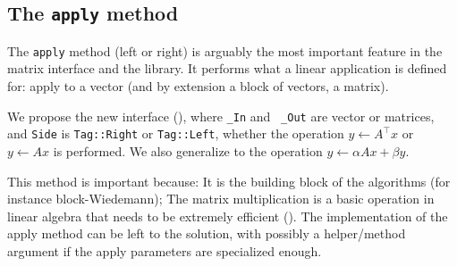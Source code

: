 \subsection{The \texttt{apply} method}\label{ssec:apply}
%
%
\par
%
The \texttt{apply} method (left or right) is arguably the most important
feature in the matrix interface and the \linbox library. It performs what a
linear application is defined for: apply to a vector (and by extension  a block
of vectors, \ie a matrix).
%
\par
%
We propose the new interface (), where {\tt \_In} and {\tt
\_Out} are vector or matrices, and {\tt Side} is {\tt Tag::Right} or
{\tt Tag::Left}, whether the operation $y \gets A^{\top} x$ or  $y \gets A x$ is
performed. We also generalize to the operation $y \gets \alpha A x + \beta y$.
%

%
This method is important because: It is the building block of the \applin
algorithms (for instance block-Wiedemann); The matrix multiplication is
a basic operation in linear algebra that needs to be extremely efficient ().
%
%
%
The implementation of the apply method can be left to the \mul solution, with possibly a helper/method argument if the apply
parameters are specialized enough.
%
%
%
